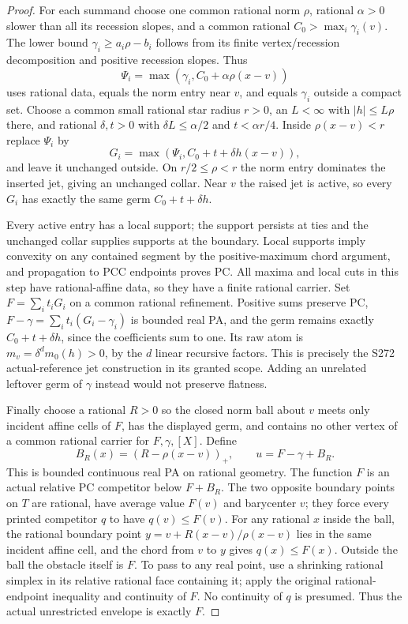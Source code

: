 \documentclass[11pt]{article}
\begin{document}
\begin{proof}
For each summand choose one common rational norm $\rho$, rational $\alpha>0$ slower than all its recession slopes, and a common rational $C_0>\max_i\gamma_i(v)$. The lower bound $\gamma_i\geq a_i\rho-b_i$ follows from its finite vertex/recession decomposition and positive recession slopes. Thus
\[
 \Psi_i=\max(\gamma_i,C_0+\alpha\rho(x-v))
\]
uses rational data, equals the norm entry near $v$, and equals $\gamma_i$ outside a compact set. Choose a common small rational star radius $r>0$, an $L<\infty$ with $|h|\leq L\rho$ there, and rational $\delta,t>0$ with $\delta L\leq\alpha/2$ and $t<\alpha r/4$. Inside $\rho(x-v)<r$ replace $\Psi_i$ by
\[
 G_i=\max(\Psi_i,C_0+t+\delta h(x-v)),
\]
and leave it unchanged outside. On $r/2\leq\rho<r$ the norm entry dominates the inserted jet, giving an unchanged collar. Near $v$ the raised jet is active, so every $G_i$ has exactly the same germ $C_0+t+\delta h$.

Every active entry has a local support; the support persists at ties and the unchanged collar supplies supports at the boundary. Local supports imply convexity on any contained segment by the positive-maximum chord argument, and propagation to PCC endpoints proves PC. All maxima and local cuts in this step have rational-affine data, so they have a finite rational carrier. Set $F=\sum_i t_iG_i$ on a common rational refinement. Positive sums preserve PC, $F-\gamma=\sum_i t_i(G_i-\gamma_i)$ is bounded real PA, and the germ remains exactly $C_0+t+\delta h$, since the coefficients sum to one. Its raw atom is $m_v=\delta^d m_0(h)>0$, by the $d$ linear recursive factors. This is precisely the S272 actual-reference jet construction in its granted scope. Adding an unrelated leftover germ of $\gamma$ instead would not preserve flatness.

Finally choose a rational $R>0$ so the closed norm ball about $v$ meets only incident affine cells of $F$, has the displayed germ, and contains no other vertex of a common rational carrier for $F,\gamma,[X]$. Define
\[
 B_R(x)=(R-\rho(x-v))_+,\qquad u=F-\gamma+B_R.
\]
This is bounded continuous real PA on rational geometry. The function $F$ is an actual relative PC competitor below $F+B_R$. The two opposite boundary points on $T$ are rational, have average value $F(v)$ and barycenter $v$; they force every printed competitor $q$ to have $q(v)\leq F(v)$. For any rational $x$ inside the ball, the rational boundary point $y=v+R(x-v)/\rho(x-v)$ lies in the same incident affine cell, and the chord from $v$ to $y$ gives $q(x)\leq F(x)$. Outside the ball the obstacle itself is $F$. To pass to any real point, use a shrinking rational simplex in its relative rational face containing it; apply the original rational-endpoint inequality and continuity of $F$. No continuity of $q$ is presumed. Thus the actual unrestricted envelope is exactly $F$.


\end{proof}
\end{document}
